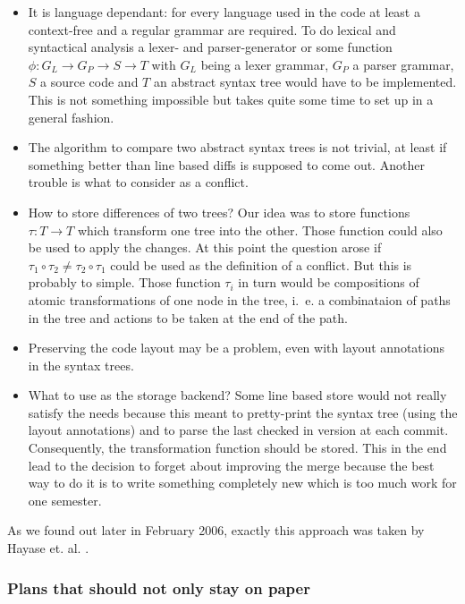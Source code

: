 \documentclass[fleqn, 10pt, a4paper]{report} \usepackage{amssymb}
\begin{document}
\begin{itemize}
\item It is language dependant: for every language used in the code at
  least a context-free and a regular grammar are required. To do
  lexical and syntactical analysis a lexer- and parser-generator or
  some function $\phi : G_L \rightarrow G_P \rightarrow S \rightarrow
  T$ with $G_L$ being a lexer grammar, $G_P$ a parser grammar, $S$ a
  source code and $T$ an abstract syntax tree would have to be
  implemented. This is not something impossible but takes quite some
  time to set up in a general fashion.
\item The algorithm to compare two abstract syntax trees is not
  trivial, at least if something better than line based diffs is
  supposed to come out. Another trouble is what to consider as a
  conflict.
\item How to store differences of two trees? Our idea was to store
  functions $\tau : T \rightarrow T$ which transform one tree into the
  other.  Those function could also be used to apply the changes. At
  this point the question arose if $\tau_1 \circ \tau_2 \neq \tau_2
  \circ \tau_1$ could be used as the definition of a conflict. But
  this is probably to simple.  Those function $\tau_i$ in turn would
  be compositions of atomic transformations of one node in the tree,
  i.~e. a combinataion of paths in the tree and actions to be taken at
  the end of the path.
\item Preserving the code layout may be a problem, even with layout
  annotations in the syntax trees.
\item What to use as the storage backend? Some line based store would
  not really satisfy the needs because this meant to pretty-print the
  syntax tree (using the layout annotations) and to parse the last
  checked in version at each commit. Consequently, the transformation
  function should be stored. This in the end lead to the decision to
  forget about improving the merge because the best way to do it is to
  write something completely new which is too much work for one
  semester.
\end{itemize}

As we found out later in February 2006, exactly this approach was
taken by Hayase et. al. \cite{HMI05}.

\subsubsection{Plans that should not only stay on paper}
\end{document}
